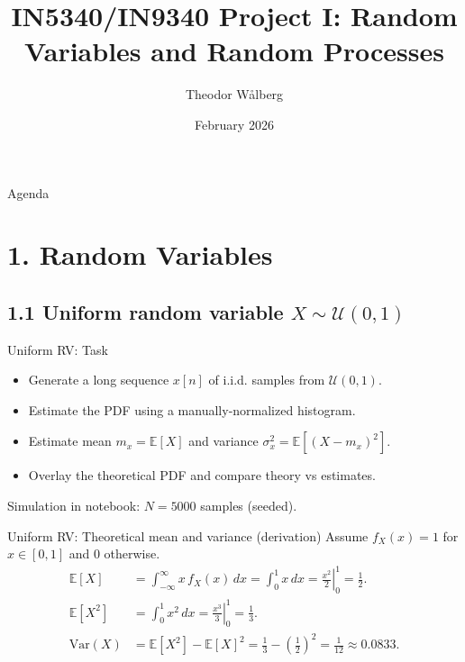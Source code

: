 \documentclass[aspectratio=169,10pt]{beamer}
\title[IN5340 Project I]{IN5340/IN9340 Project I: Random Variables and Random Processes}
\author{Theodor W\aa lberg}
\institute{University of Oslo}
\date{February 2026}
\begin{document}
\begin{frame}
	\titlepage
\end{frame}

\begin{frame}{Agenda}
	\tableofcontents
\end{frame}

\section{1. Random Variables}

\subsection{1.1 Uniform random variable \texorpdfstring{$X \sim \mathcal{U}(0,1)$}{X ~ U(0,1)}}

\begin{frame}{Uniform RV: Task}
\begin{itemize}
	\item Generate a long sequence $x[n]$ of i.i.d. samples from $\mathcal{U}(0,1)$.
	\item Estimate the PDF using a manually-normalized histogram.
	\item Estimate mean $m_x = \mathbb{E}[X]$ and variance $\sigma_x^2 = \mathbb{E}[(X-m_x)^2]$.
	\item Overlay the theoretical PDF and compare theory vs estimates.
\end{itemize}
\vspace{0.5em}
\small
Simulation in notebook: $N=5000$ samples (seeded).
\end{frame}

\begin{frame}{Uniform RV: Theoretical mean and variance (derivation)}
Assume $f_X(x)=1$ for $x\in[0,1]$ and $0$ otherwise.
\vspace{0.5em}
\begin{align*}
\mathbb{E}[X]
&= \int_{-\infty}^{\infty} x\, f_X(x)\,dx
= \int_{0}^{1} x\,dx
= \left.\frac{x^2}{2}\right|_{0}^{1}
= \frac{1}{2}.\\
\mathbb{E}[X^2]
&= \int_{0}^{1} x^2\,dx
= \left.\frac{x^3}{3}\right|_{0}^{1}
= \frac{1}{3}.\\
\mathrm{Var}(X)
&= \mathbb{E}[X^2]-\mathbb{E}[X]^2
= \frac{1}{3}-\left(\frac{1}{2}\right)^2
= \frac{1}{12}\approx 0.0833.
\end{align*}
\end{frame}
\end{document}
